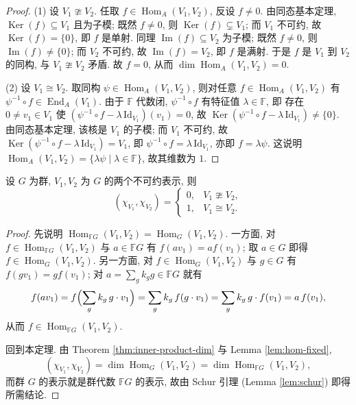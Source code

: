 \begin{proof}
\mbox{}\par\vspace{-0.2em}
(1) 设 $V_1\ncong V_2$. 任取 $f\in\operatorname{Hom}_A(V_1,V_2)$, 反设 $f\neq 0$.
由同态基本定理, $\operatorname{Ker}(f)\subseteq V_1$ 且为子模; 既然 $f\neq 0$, 则
$\operatorname{Ker}(f)\subsetneq V_1$; 而 $V_1$ 不可约, 故 $\operatorname{Ker}(f)=\{0\}$, 即 $f$ 是单射.
同理 $\operatorname{Im}(f)\subseteq V_2$ 为子模; 既然 $f\neq 0$, 则 $\operatorname{Im}(f)\neq\{0\}$;
而 $V_2$ 不可约, 故 $\operatorname{Im}(f)=V_2$, 即 $f$ 是满射.
于是 $f$ 是 $V_1$ 到 $V_2$ 的同构, 与 $V_1\ncong V_2$ 矛盾. 故 $f=0$, 从而
$\dim\operatorname{Hom}_A(V_1,V_2)=0$.

(2) 设 $V_1\cong V_2$. 取同构 $\psi\in\operatorname{Hom}_A(V_1,V_2)$, 则对任意
$f\in\operatorname{Hom}_A(V_1,V_2)$ 有 $\psi^{-1}\circ f\in\operatorname{End}_A(V_1)$.
由于 $\mathbb{F}$ 代数闭, $\psi^{-1}\circ f$ 有特征值 $\lambda\in\mathbb{F}$, 即
存在 $0\neq v_1\in V_1$ 使 $(\psi^{-1}\circ f-\lambda\,\mathrm{Id}_{V_1})(v_1)=0$,
故 $\operatorname{Ker}(\psi^{-1}\circ f-\lambda\,\mathrm{Id}_{V_1})\neq\{0\}$.
由同态基本定理, 该核是 $V_1$ 的子模; 而 $V_1$ 不可约, 故
$\operatorname{Ker}(\psi^{-1}\circ f-\lambda\,\mathrm{Id}_{V_1})=V_1$, 即
$\psi^{-1}\circ f=\lambda\,\mathrm{Id}_{V_1}$, 亦即 $f=\lambda\psi$.
这说明 $\operatorname{Hom}_A(V_1,V_2)=\{\lambda\psi\mid \lambda\in\mathbb{F}\}$, 故其维数为 $1$.
\end{proof}

\begin{theorem}\label{thm:orthogonality}
设 $G$ 为群, $V_1,V_2$ 为 $G$ 的两个不可约表示, 则
\[
  (\chi_{V_1},\chi_{V_2})=
  \begin{cases}
    0, & V_1\ncong V_2,\\
    1, & V_1\cong V_2.
  \end{cases}
\]
\end{theorem}

\begin{proof}
先说明 $\operatorname{Hom}_{\mathbb{F}G}(V_1,V_2)=\operatorname{Hom}_G(V_1,V_2)$.
一方面, 对 $f\in\operatorname{Hom}_{\mathbb{F}G}(V_1,V_2)$ 与 $a\in\mathbb{F}G$ 有
$f(av_1)=af(v_1)$; 取 $a\in G$ 即得 $f\in\operatorname{Hom}_G(V_1,V_2)$.
另一方面, 对 $f\in\operatorname{Hom}_G(V_1,V_2)$ 与 $g\in G$ 有 $f(gv_1)=gf(v_1)$;
对 $a=\sum_g k_g g\in\mathbb{F}G$ 就有
\[
  f(av_1)=f\Bigl(\sum_g k_g\,g\cdot v_1\Bigr)
  =\sum_g k_g\,f(g\cdot v_1)=\sum_g k_g\,g\cdot f(v_1)=a\,f(v_1),
\]
从而 $f\in\operatorname{Hom}_{\mathbb{F}G}(V_1,V_2)$.

回到本定理. 由 Theorem \ref{thm:inner-product-dim} 与 Lemma \ref{lem:hom-fixed},
\[
  (\chi_{V_1},\chi_{V_2})=\dim\operatorname{Hom}_G(V_1,V_2)
  =\dim\operatorname{Hom}_{\mathbb{F}G}(V_1,V_2),
\]
而群 $G$ 的表示就是群代数 $\mathbb{F}G$ 的表示, 故由 Schur 引理
(Lemma \ref{lem:schur}) 即得所需结论.
\end{proof}


